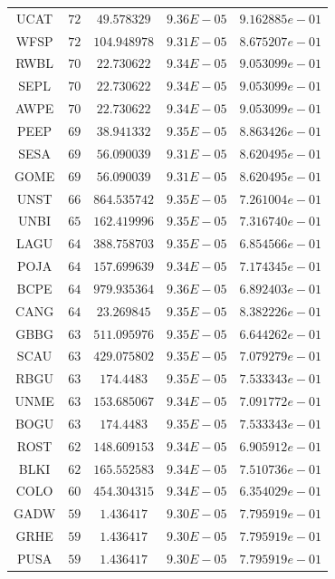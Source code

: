 \documentclass{statsoc}
\begin{document}
\begin{table}
{\begin{tabular}{*{5}{c}}
UCAT  &  $72$  &  $49.578329$  &  $9.36E-05$  &  $9.162885e-01$\\
WFSP  &  $72$  &  $104.948978$  &  $9.31E-05$  &  $8.675207e-01$\\
RWBL  &  $70$  &  $22.730622$  &  $9.34E-05$  &  $9.053099e-01$\\
SEPL  &  $70$  &  $22.730622$  &  $9.34E-05$  &  $9.053099e-01$\\
AWPE  &  $70$  &  $22.730622$  &  $9.34E-05$  &  $9.053099e-01$\\
PEEP  &  $69$  &  $38.941332$  &  $9.35E-05$  &  $8.863426e-01$\\
SESA  &  $69$  &  $56.090039$  &  $9.31E-05$  &  $8.620495e-01$\\
GOME  &  $69$  &  $56.090039$  &  $9.31E-05$  &  $8.620495e-01$\\
UNST  &  $66$  &  $864.535742$  &  $9.35E-05$  &  $7.261004e-01$\\
UNBI  &  $65$  &  $162.419996$  &  $9.35E-05$  &  $7.316740e-01$\\
LAGU  &  $64$  &  $388.758703$  &  $9.35E-05$  &  $6.854566e-01$\\
POJA  &  $64$  &  $157.699639$  &  $9.34E-05$  &  $7.174345e-01$\\
BCPE  &  $64$  &  $979.935364$  &  $9.36E-05$  &  $6.892403e-01$\\
CANG  &  $64$  &  $23.269845$  &  $9.35E-05$  &  $8.382226e-01$\\
GBBG  &  $63$  &  $511.095976$  &  $9.35E-05$  &  $6.644262e-01$\\
SCAU  &  $63$  &  $429.075802$  &  $9.35E-05$  &  $7.079279e-01$\\
RBGU  &  $63$  &  $174.4483$  &  $9.35E-05$  &  $7.533343e-01$\\
UNME  &  $63$  &  $153.685067$  &  $9.34E-05$  &  $7.091772e-01$\\
BOGU  &  $63$  &  $174.4483$  &  $9.35E-05$  &  $7.533343e-01$\\
ROST  &  $62$  &  $148.609153$  &  $9.34E-05$  &  $6.905912e-01$\\
BLKI  &  $62$  &  $165.552583$  &  $9.34E-05$  &  $7.510736e-01$\\
COLO  &  $60$  &  $454.304315$  &  $9.34E-05$  &  $6.354029e-01$\\
GADW  &  $59$  &  $1.436417$  &  $9.30E-05$  &  $7.795919e-01$\\
GRHE  &  $59$  &  $1.436417$  &  $9.30E-05$  &  $7.795919e-01$\\
PUSA  &  $59$  &  $1.436417$  &  $9.30E-05$  &  $7.795919e-01$\\

\end{tabular}}
\end{table}
\end{document}
